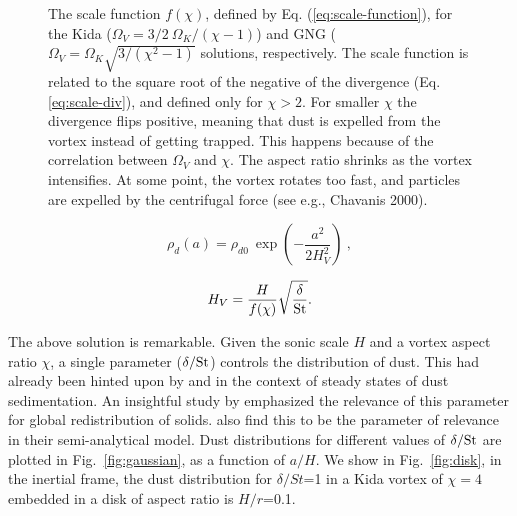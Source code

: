 \documentclass[apj]{emulateapj}
\newcommand{\Eq}[1]{Eq. (\ref{#1})}
\newcommand{\eq}[1]{\Eq{#1}}
\newcommand{\eqp}[1]{(Eq. \ref{#1})}
\newcommand{\Fig}[1]{Fig.~\ref{#1}}
\newcommand{\fig}[1]{\Fig{#1}}
\newcommand{\beq}{\begin{equation}}
\newcommand{\eeq}{\end{equation}}
\begin{document}
\begin{figure}
  \begin{center}
  \end{center}
\caption[]{The scale function $f(\chi)$, defined by
  \eq{eq:scale-function}, for the Kida ($\varOmega_V=3/2
  \ \varOmega_K/(\chi-1)$) and GNG ($\varOmega_V=\varOmega_K
  \sqrt{3/(\chi^2-1)}$ solutions, respectively. The scale function is
  related to the square root of the negative of the divergence
  \eqp{eq:scale-div}, and defined only for $\chi>2$. For smaller $\chi$ the
  divergence flips positive, meaning that dust is expelled from the
  vortex instead of getting trapped. This happens because of the
  correlation between $\varOmega_V$ and $\chi$. The aspect ratio shrinks
  as the vortex intensifies. At some point, the vortex rotates too
  fast, and particles are expelled by the centrifugal force (see e.g.,
  Chavanis 2000).}
 \label{fig:scale-function}
\end{figure}


\beq
\rho_d(a) = \rho_{d0} \ \exp\left(-\frac{a^2}{2H_V^2}\right) \ ,
\label{eq:gen_axi}
\eeq

\beq
 H_V = \frac{H}{f(\chi)} \sqrt{\frac{\delta}{\rm St}}. 
\label{eq:hv}
\eeq

The above solution is remarkable. Given the sonic scale $H$ and a vortex 
aspect ratio $\chi$, a single parameter ($\delta/{\rm St}$) controls the 
distribution of dust. This had already been 
hinted upon by \citet{Cuzzi93} and \citet{Dubrulle95} 
in the context of steady states of dust sedimentation. An insightful study by 
\citet{Jacquet12} emphasized the relevance of this parameter for 
global redistribution of solids. \citet{Birnstiel13} also find this to be 
the parameter of relevance in their semi-analytical model. Dust distributions 
for different values of $\delta/{\rm St}$ are plotted in \fig{fig:gaussian}, as a 
function of $a/H$. We show in \fig{fig:disk}, in the inertial frame, 
the dust distribution for $\delta/St$=1 in a Kida vortex of $\chi=4$ embedded in a 
disk of aspect ratio is $H/r$=0.1. 
\end{document}
